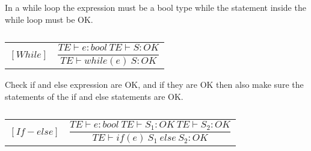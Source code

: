 In a while loop the expression must be a bool type while the statement inside the while loop must be OK.
\begin{table}[H]
    \begin{center}
    \begin{longtable}[c] { r c }
        $[While]$ 
        & 
        \( \dfrac{T E  \vdash e  :  bool \ T E \vdash S : OK}{T E \vdash while(e) \ S : OK} \)

    \end{longtable}
    \caption{}
        \end{center}
\end{table}

Check if and else expression are OK, and if they are OK then also make sure the statements of the if and else statements are OK.
\begin{table}[H]
    \begin{center}
    \begin{longtable}[c] { r c }
        $[If - else]$ 
        & 
        \( \dfrac{T E  \vdash e  :  bool \ T E \vdash S_1 : OK \ T E \vdash S_2 : OK}
        {T E \vdash if(e) \ S_1 \ else \ S_2 : OK} \)

    \end{longtable}
    \caption{}
        \end{center}
\end{table}

